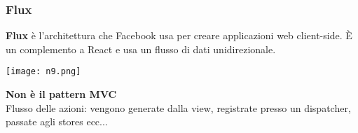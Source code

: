 \begin{frame}
\frametitle{Flux}
	\par
  	\textbf{Flux} è l’architettura che Facebook usa per creare applicazioni web client-side. È un complemento a React e usa un flusso di dati unidirezionale.\\
	\begin{flushleft}
		\texttt{[image: n9.png]}	
	\end{flushleft}	
	\textbf{Non è il pattern MVC}\\
	Flusso delle azioni: vengono generate dalla view, registrate presso un dispatcher, passate agli stores ecc...	
\end{frame}



